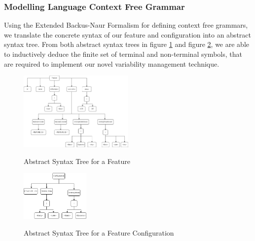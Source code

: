 \subsubsection{Modelling Language Context Free Grammar}
Using the Extended Backus-Naur Formalism for defining context free grammars, we translate the concrete syntax of our feature and configuration into an abstract syntax tree. From both abstract syntax trees in figure \ref{ast-feature} and figure \ref{ast-config},  we are able to inductively deduce the finite set of terminal and non-terminal symbols, that are required to implement our novel variability management technique.

\begin{figure}[H]
\caption{Abstract Syntax Tree for a Feature}
\centering
\includegraphics[width=0.5\textwidth]{diagrams/ast-feature.png}
\label{ast-feature}
\end{figure}

\begin{figure}[H]
\caption{Abstract Syntax Tree for a Feature Configuration}
\centering
\includegraphics[width=0.3\textwidth]{diagrams/ast-conf.png}
\label{ast-config}
\end{figure}

